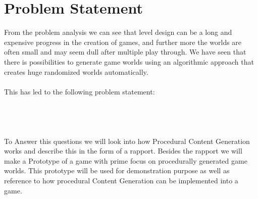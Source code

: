 \section{Problem Statement}

From the problem analysis we can see that level design can be a long and expensive progress in the creation of games, and further more the worlds are often small and may seem dull after multiple play through. We have seen that there is possibilities to generate game worlds using an algorithmic approach that creates huge randomized worlds automatically.
\\\\
This has led to the following problem statement:
\\\\
\noindent{}
\\\\\\
To Answer this questions we will look into how Procedural Content Generation works and describe this in the form of a rapport. Besides the rapport we will make a Prototype of a game with prime focus on procedurally generated game worlds. This prototype will be used for demonstration purpose as well as reference to how procedural Content Generation can be implemented into a game.